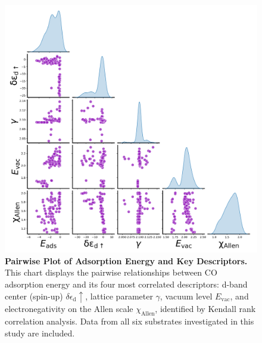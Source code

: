 \begin{figure}[htbp]
  \centering
  \includegraphics[width=\textwidth]{supp_fig19_pairwise_eads_des.png}
  \caption{\textbf{Pairwise Plot of Adsorption Energy and Key Descriptors.}
  This chart displays the pairwise relationships between CO adsorption energy and
  its four most correlated descriptors: d-band center (spin-up) $\delta\epsilon_{\text{d}}\uparrow$,
  lattice parameter $\gamma$, vacuum level $E_\text{vac}$, and electronegativity
  on the Allen scale $\chi_\text{Allen}$, identified by Kendall rank correlation analysis.
  Data from all six substrates investigated in this study are included.}
  \label{supp_fig19:pairwise_eads_des}
\end{figure}

